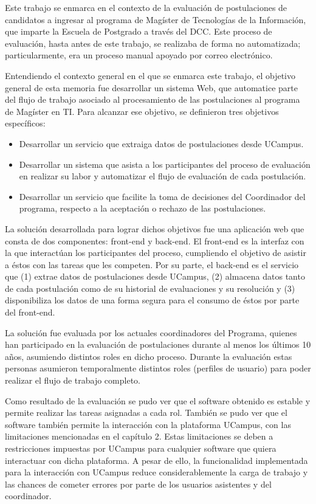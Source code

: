 \begin{conclusion}
	Este trabajo se enmarca en el contexto de la evaluación de postulaciones de
	candidatos a ingresar al programa de Magíster de Tecnologías de la
	Información, que imparte la Escuela de Postgrado a través del DCC. Este
	proceso de evaluación, hasta antes de este trabajo, se realizaba de forma no
	automatizada; particularmente, era un proceso manual apoyado por correo
	electrónico.

	Entendiendo el contexto general en el que se enmarca este trabajo, el
	objetivo general de esta memoria fue desarrollar un sistema Web, que
	automatice parte del flujo de trabajo asociado al procesamiento de las
	postulaciones al programa de Magíster en TI. Para alcanzar ese objetivo, se
	definieron tres objetivos específicos:

	\begin{itemize}
		\item Desarrollar un servicio que extraiga datos de postulaciones desde
		UCampus.
		\item Desarrollar un sistema que asista a los participantes del proceso
		de evaluación en realizar su labor y automatizar el flujo de evaluación
		de cada postulación.
		\item Desarrollar un servicio que facilite la toma de decisiones del
		Coordinador del programa, respecto a la aceptación o rechazo de las
		postulaciones.
	\end{itemize}

	La solución desarrollada para lograr dichos objetivos fue una aplicación web
	que consta de dos componentes: front-end y back-end. El front-end es la
	interfaz con la que interactúan los participantes del proceso, cumpliendo el
	objetivo de asistir a éstos con las tareas que les competen. Por su parte,
	el back-end es el servicio que (1) extrae datos de postulaciones desde
	UCampus, (2) almacena datos tanto de cada postulación como de su historial
	de evaluaciones y su resolución y (3) disponibiliza los datos de una forma
	segura para el consumo de éstos por parte del front-end.

	La solución fue evaluada por los actuales coordinadores del Programa,
	quienes han participado en la evaluación de postulaciones durante al menos
	los últimos 10 años, asumiendo distintos roles en dicho proceso. Durante la
	evaluación estas personas asumieron temporalmente distintos roles (perfiles
	de usuario) para poder realizar el flujo de trabajo completo.

	Como resultado de la evaluación se pudo ver que el software obtenido es
	estable y permite realizar las tareas asignadas a cada rol. También se pudo
	ver que el software también permite la interacción con la plataforma
	UCampus, con las limitaciones mencionadas en el capítulo 2. Estas
	limitaciones se deben a restricciones impuestas por UCampus para cualquier
	software que quiera interactuar con dicha plataforma. A pesar de ello, la
	funcionalidad implementada para la interacción con UCampus reduce
	considerablemente la carga de trabajo y las chances de cometer errores por
	parte de los usuarios asistentes y del coordinador.


\end{conclusion}
